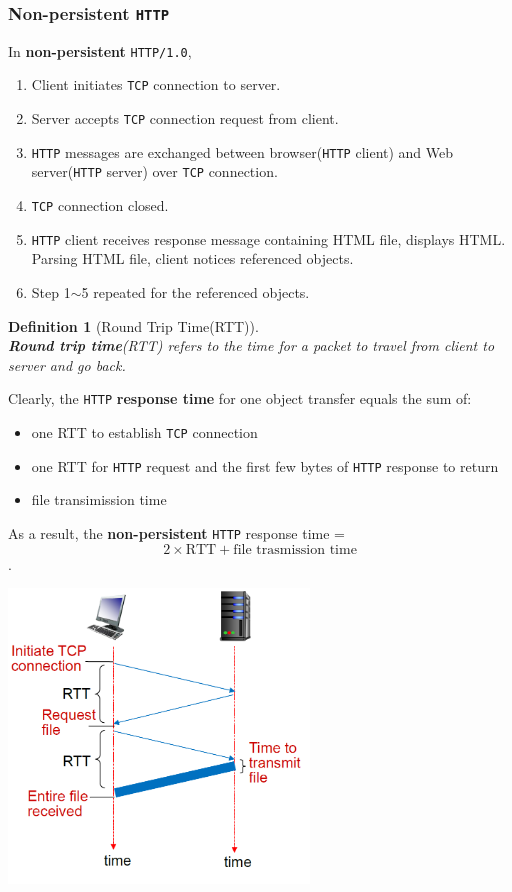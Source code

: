 \documentclass[12pt]{article}
\newtheorem{definition}{Definition}[section]
\theoremstyle{definition}
\begin{document}
\subsubsection{Non-persistent \texttt{HTTP}}
In \textbf{non-persistent} \texttt{HTTP/1.0},
\begin{enumerate}
  \item Client initiates \texttt{TCP} connection to server.
  \item Server accepts \texttt{TCP} connection request from client.
  \item \texttt{HTTP} messages are exchanged between browser(\texttt{HTTP} client) and Web server(\texttt{HTTP} server) over \texttt{TCP} connection.
  \item \texttt{TCP} connection closed.
  \item \texttt{HTTP} client receives response message containing HTML file, displays HTML. Parsing HTML file, client notices referenced objects.
  \item Step 1$\sim$5 repeated for the referenced objects. 
\end{enumerate}
\begin{definition}[Round Trip Time(RTT)]
\hfill\\\normalfont \textbf{Round trip time}(RTT) refers to the time for a packet to travel from client to server and go back.
\end{definition}
\begin{minipage}{0.45\textwidth}
Clearly, the \texttt{HTTP} \textbf{response time} for one object transfer equals the sum of:
\begin{itemize}
  \item one RTT to establish \texttt{TCP} connection
  \item one RTT for \texttt{HTTP} request and the first few bytes of \texttt{HTTP} response to return
  \item file transimission time
\end{itemize}
As a result, the \textbf{non-persistent} \texttt{HTTP} response time = \[2\times \text{RTT}+\text{file trasmission time}\].

\end{minipage}
\hfill
\begin{minipage}{0.5\textwidth}
\includegraphics[width = 8cm]{2_2_1.png}
\end{minipage}
\end{document}
